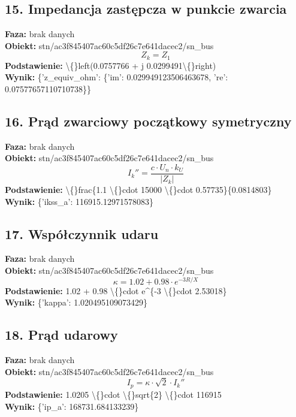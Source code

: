 ﻿\documentclass[11pt]{article}
\begin{document}
\subsection*{15. Impedancja zastępcza w punkcie zwarcia}
\textbf{Faza:} brak danych\\
\textbf{Obiekt:} stn/ac3f845407ac60c5df26c7e641dacec2/sn\_bus\\
\[
Z_k = Z_1
\]
\textbf{Podstawienie:} \textbackslash\{\}left(0.0757766 + j 0.0299491\textbackslash\{\}right)\\
\textbf{Wynik:} \{'z\_equiv\_ohm': \{'im': 0.029949123506463678, 're': 0.07577657110710738\}\}\\
\subsection*{16. Prąd zwarciowy początkowy symetryczny}
\textbf{Faza:} brak danych\\
\textbf{Obiekt:} stn/ac3f845407ac60c5df26c7e641dacec2/sn\_bus\\
\[
I_{k}'' = \frac{c \cdot U_n \cdot k_U}{\left|Z_k\right|}
\]
\textbf{Podstawienie:} \textbackslash\{\}frac\{1.1 \textbackslash\{\}cdot 15000 \textbackslash\{\}cdot 0.57735\}\{0.0814803\}\\
\textbf{Wynik:} \{'ikss\_a': 116915.12971578083\}\\
\subsection*{17. Współczynnik udaru}
\textbf{Faza:} brak danych\\
\textbf{Obiekt:} stn/ac3f845407ac60c5df26c7e641dacec2/sn\_bus\\
\[
\kappa = 1.02 + 0.98 \cdot e^{-3 R/X}
\]
\textbf{Podstawienie:} 1.02 + 0.98 \textbackslash\{\}cdot e\textasciicircum{}\{-3 \textbackslash\{\}cdot 2.53018\}\\
\textbf{Wynik:} \{'kappa': 1.020495109073429\}\\
\subsection*{18. Prąd udarowy}
\textbf{Faza:} brak danych\\
\textbf{Obiekt:} stn/ac3f845407ac60c5df26c7e641dacec2/sn\_bus\\
\[
I_p = \kappa \cdot \sqrt{2} \cdot I_{k}''
\]
\textbf{Podstawienie:} 1.0205 \textbackslash\{\}cdot \textbackslash\{\}sqrt\{2\} \textbackslash\{\}cdot 116915\\
\textbf{Wynik:} \{'ip\_a': 168731.684133239\}\\
\end{document}
